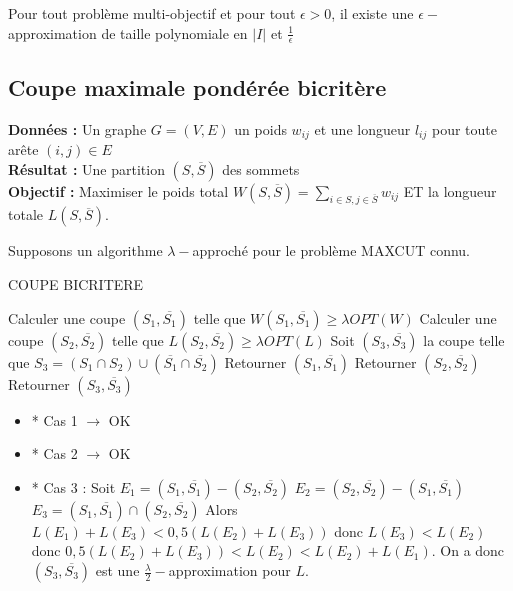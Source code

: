 \documentclass[a4paper,11pt]{article}
\begin{document}


\begin{thrm}
    Pour tout problème multi-objectif et pour tout $\epsilon > 0$, il existe une
    $\epsilon-$approximation de taille polynomiale en $|I|$ et $\frac{1}{\epsilon}$
\end{thrm}

\subsection{Coupe maximale pondérée bicritère}

\textbf{Données :} Un graphe $G=(V, E)$ un poids $w_{ij}$ et une longueur $l_{ij}$ pour toute arête
$(i, j) \in E$\\
\textbf{Résultat :} Une partition $(S, \overline{S})$ des sommets\\
\textbf{Objectif :} Maximiser le poids total $W(S, \overline{S}) = \sum_{i \in S, j \in
\overline{S}} w_{ij}$ ET la longueur totale $L(S, \overline{S})$.

Supposons un algorithme $\lambda-$approché pour le problème MAXCUT connu.

\begin{algorithm}[h]
    \caption{COUPE BICRITERE}
    \begin{algorithmic}[1]
        \State Calculer une coupe $(S_1, \overline{S_1})$ telle que $W(S_1, \overline{S_1}) \geq
        \lambda OPT(W)$
        \State Calculer une coupe $(S_2, \overline{S_2})$ telle que $L(S_2, \overline{S_2}) \geq
        \lambda OPT(L)$
        \State Soit $(S_3, \overline{S_3})$ la coupe telle que $S_3 = (S_1 \cap S_2) \cup
        (\overline{S_1} \cap \overline{S_2})$
            \State Retourner $(S_1, \overline{S_1})$
            \State Retourner $(S_2, \overline{S_2})$
        \Else
            \State Retourner $(S_3, \overline{S_3})$
        \EndIf
    \end{algorithmic}
\end{algorithm}


\begin{itemize}
    \item* Cas 1 $\rightarrow$ OK
    \item* Cas 2 $\rightarrow$ OK
    \item* Cas 3 : Soit 
        $E_1 = (S_1, \overline{S_1}) - (S_2, \overline{S_2})$ %
        $E_2 = (S_2, \overline{S_2}) - (S_1, \overline{S_1})$ %
        $E_3 = (S_1, \overline{S_1}) \cap (S_2, \overline{S_2})$ %
        Alors $L(E_1) + L(E_3) < 0,5(L(E_2) + L(E_3))$ donc $L(E_3) < L(E_2)$ donc $0,5(L(E_2) +
        L(E_3)) < L(E_2) < L(E_2) + L(E_1)$. On a donc $(S_3, \overline{S_3})$ est une
        $\frac{\lambda}{2} -$approximation pour $L$.
\end{itemize}
\end{document}
